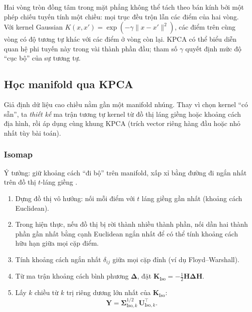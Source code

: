 \begin{example}
Hai vòng tròn đồng tâm trong mặt phẳng không thể tách theo bán kính bởi một phép chiếu tuyến tính một chiều: mọi trục đều trộn lẫn các điểm của hai vòng. Với kernel Gaussian $K(x,x') = \exp(-\gamma\|x-x'\|^2)$, các điểm trên cùng vòng có độ tương tự khác với các điểm ở vòng còn lại. KPCA có thể biểu diễn quan hệ phi tuyến này trong vài thành phần đầu; tham số $\gamma$ quyết định mức độ ``cục bộ'' của sự tương tự.
\end{example}

\subsection{Học manifold qua KPCA}
\label{sec:manifold}

Giả định dữ liệu cao chiều nằm gần một manifold nhúng. Thay vì chọn kernel ``có sẵn'', ta \emph{thiết kế} ma trận tương tự kernel từ đồ thị láng giềng hoặc khoảng cách địa hình, rồi áp dụng cùng khung KPCA (trích vector riêng hàng đầu hoặc nhỏ nhất tùy bài toán).

\subsubsection{Isomap}

Ý tưởng: giữ khoảng cách ``đi bộ'' trên manifold, xấp xỉ bằng đường đi ngắn nhất trên đồ thị $t$-láng giềng \cite{tenenbaum2000isomap,mohri2018foundations}.

\begin{enumerate}
  \item Dựng đồ thị vô hướng: nối mỗi điểm với $t$ láng giềng gần nhất (khoảng cách Euclidean).
  \item Trong hiện thực, nếu đồ thị bị rời thành nhiều thành phần, nối dần hai thành phần gần nhất bằng cạnh Euclidean ngắn nhất để có thể tính khoảng cách hữu hạn giữa mọi cặp điểm.
  \item Tính khoảng cách ngắn nhất $\delta_{ij}$ giữa mọi cặp đỉnh (ví dụ Floyd--Warshall).
  \item Từ ma trận khoảng cách bình phương $\boldsymbol{\Delta}$, đặt $\mathbf{K}_{\mathrm{Iso}} = -\frac{1}{2}\mathbf{H}\boldsymbol{\Delta}\mathbf{H}$.
  \item Lấy $k$ chiều từ $k$ trị riêng dương lớn nhất của $\mathbf{K}_{\mathrm{Iso}}$:
  \begin{equation}
  \mathbf{Y} = \boldsymbol{\Sigma}_{\mathrm{Iso},k}^{1/2}\,\mathbf{U}_{\mathrm{Iso},k}^\top.
  \label{eq:isomap-solution}
  \end{equation}
\end{enumerate}

